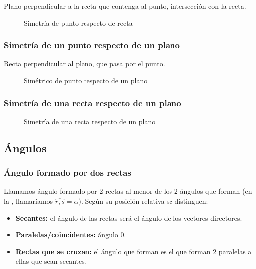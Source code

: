 Plano perpendicular a la recta que contenga al punto, intersección con la recta.

\begin{figure}[hbtp]
\centering
{}

\label{fig::sim::punto-recta}
\caption{Simetría de punto respecto de recta}
\end{figure}


\subsubsection{Simetría de un punto respecto de un plano}

Recta perpendicular al plano, que pasa por el punto.

\begin{figure}[hbtp]
\centering
{}

\label{fig::sim::punto-plano}
\caption{Simétrico de punto respecto de un plano}
\end{figure}



\subsubsection{Simetría de una recta respecto de un plano}

\begin{figure}[hbtp]
\centering
{}

\label{fig::sim::recta-plano}
\caption{Simetría de una recta respecto de un plano}
\end{figure}



\newpage
\subsection{Ángulos}
\subsubsection{Ángulo formado por dos rectas}

Llamamos ángulo formado por 2 rectas al menor de los 2 ángulos que forman (en la , llamaríamos $\widehat{r,s} = \alpha$). Según su posición relativa se distinguen:

\begin{itemize}
  \item \textbf{Secantes:} el ángulo de las rectas será el ángulo de los vectores directores.
  \item \textbf{Paralelas/coincidentes:} ángulo 0.
  \item \textbf{Rectas que se cruzan:} el ángulo que forman es el que forman 2 paralelas a ellas que sean secantes. 
\end{itemize}

